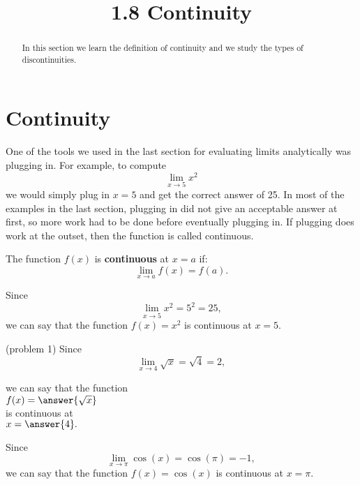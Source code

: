 \documentclass{ximera}
\title{1.8 Continuity}
\begin{document}
\begin{abstract}
In this section we learn the definition of continuity and we study the types of discontinuities.
\end{abstract}

\maketitle






\section{Continuity}

One of the tools we used in the last section for evaluating limits analytically was plugging in. For example, to compute
\[\lim_{x \to 5} x^2 \]
we would simply plug in $x = 5$ and get the correct answer of 25. In most of the examples in the last section, 
plugging in 
did not give an acceptable answer at first, so more work had to be done before eventually plugging in. 
If plugging does work at the outset, then the function is called continuous.

\begin{definition}[Continuity]
The function $f(x)$ is \textbf{continuous} at $x = a$ if:
\[\lim_{x \to a} f(x) = f(a).\]
\end{definition}

\begin{example}[example 1]
Since
\[\lim_{x \to 5} x^2 = 5^2 = 25,\]
we can say that the function $f(x) = x^2$ is continuous at $x = 5$.
\end{example}

\begin{problem}(problem 1)
Since
\[\lim_{x \to 4} \sqrt{x} = \sqrt{4} = 2,\]
\begin{center}
we can say that the function \\
$f(x) = \answer{\sqrt x}$ \\
is continuous at \\
$x = \answer{4}.$
\end{center}
\end{problem}


\begin{example}[example 2]
Since
\[\lim_{x \to \pi} \cos(x) = \cos(\pi) = -1,\]
we can say that the function $f(x) = \cos(x)$ is continuous at $x = \pi$.
\end{example}
\end{document}
